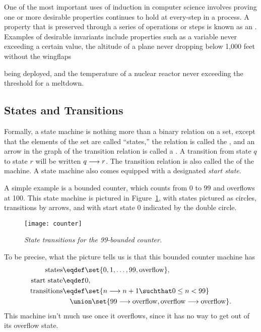 \iffalse
You may already have seen them in a digital logic course,
a compiler course, or a probability course.
\fi

One of the most important uses of induction in computer science
involves proving one or more desirable properties continues to hold at
every-step in a process.  A property that is preserved through a
series of operations or steps is known as an .
Examples of desirable invariants include properties such as a variable
never exceeding a certain value, the altitude of a plane never
dropping below 1,000 feet without the wingflaps
\iffalse and landing gear\fi
being deployed, and the temperature of a nuclear reactor never
exceeding the threshold for a meltdown.

\iffalse  %
In particular, we show that the proposition is true at the beginning
(this is the base case) and that if it is true after $t$ steps have
been taken, it will also be true after step~$t + 1$ (this is the
inductive step).  We can then use the induction principle to conclude
that the proposition is indeed an invariant, namely, that it will
always hold.
\fi

\subsection{States and Transitions}

Formally, a state machine is nothing more than a binary relation on a
set, except that the elements of the set are called ``states,'' the
relation is called the , and an arrow in the
graph of the transition relation is called a .  A
transition from state $q$ to state $r$ will be written $q \mathrel{\longrightarrow} r$.
The transition relation is also called the  of the
machine.  A state machine also comes equipped with a designated
\emph{start state}.

A simple example is a bounded counter, which counts from $0$ to $99$
and overflows at 100.  This state machine is pictured in
Figure~\ref{fig:counter}, with states pictured as circles, transitions
by arrows, and with start state 0 indicated by the double circle.
\begin{figure}
\texttt{[image: counter]}
\caption{\em State transitions for the 99-bounded counter.}
\label{fig:counter}
\end{figure}
To be precise, what the picture tells us is that this bounded counter machine has
\begin{align*}
\text{states} &  \eqdef \set{0, 1,\dots,99, \text{overflow}},\\
\text{start state}  & \eqdef 0,\\
\text{transitions} & \eqdef \set{n \movesto n+1 \suchthat 0 \le n < 99}\\
                   &\quad  \union \set{99 \movesto \text{overflow},
                                 \text{overflow} \movesto \text{overflow}}.
\end{align*}
This machine isn't much use once it overflows, since it has no way to
get out of its overflow state.

